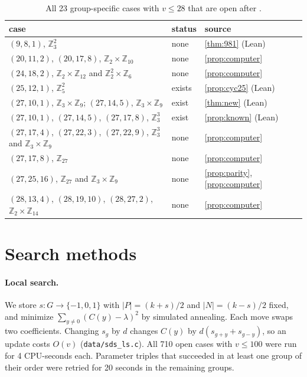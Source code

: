 \documentclass[11pt]{article}
\numberwithin{equation}{section}
\theoremstyle{definition}
\theoremstyle{remark}
\newcommand{\Z}{\mathbb Z}
\begin{document}
\begin{table}[ht]
\centering\small
\begin{tabular}{lll}
\toprule
case & status & source\\\midrule
$(9,8,1)$, $\Z_3^2$ & none & \cref{thm:981} (Lean)\\
$(20,11,2)$, $(20,17,8)$, $\Z_2\times\Z_{10}$ & none & \cref{prop:computer}\\
$(24,18,2)$, $\Z_2\times\Z_{12}$ and $\Z_2^2\times\Z_6$ & none & \cref{prop:computer}\\
$(25,12,1)$, $\Z_5^2$ & exists & \cref{prop:cyc25} (Lean)\\
$(27,10,1)$, $\Z_3\times\Z_9$; $(27,14,5)$, $\Z_3\times\Z_9$ & exist & \cref{thm:new} (Lean)\\
$(27,10,1)$, $(27,14,5)$, $(27,17,8)$, $\Z_3^3$ & exist & \cref{prop:known} (Lean)\\
$(27,17,4)$, $(27,22,3)$, $(27,22,9)$, $\Z_3^3$ and $\Z_3\times\Z_9$ & none & \cref{prop:computer}\\
$(27,17,8)$, $\Z_{27}$ & none & \cref{prop:computer}\\
$(27,25,16)$, $\Z_{27}$ and $\Z_3\times\Z_9$ & none & \cref{prop:parity}, \cref{prop:computer}\\
$(28,13,4)$, $(28,19,10)$, $(28,27,2)$, $\Z_2\times\Z_{14}$ & none & \cref{prop:computer}\\
\bottomrule
\end{tabular}
\caption{All 23 group-specific cases with $v\le 28$ that are open after \cite{HeWu2026}.}
\label{tab:small}
\end{table}

\section{Search methods}\label{sec:methods}

\paragraph{Local search.} We store $s:G\to\{-1,0,1\}$ with $|P|=(k+s)/2$ and $|N|=(k-s)/2$
fixed, and minimize $\sum_{y\ne0}(C(y)-\lambda)^2$ by simulated annealing. Each move swaps two
coefficients. Changing $s_g$ by $d$ changes $C(y)$ by $d(s_{g+y}+s_{g-y})$, so an update costs
$O(v)$ (\texttt{data/sds\_ls.c}). All 710 open cases with $v\le 100$ were run for 4 CPU-seconds
each. Parameter triples that succeeded in at least one group of their order were retried for
20 seconds in the remaining groups.
\end{document}
